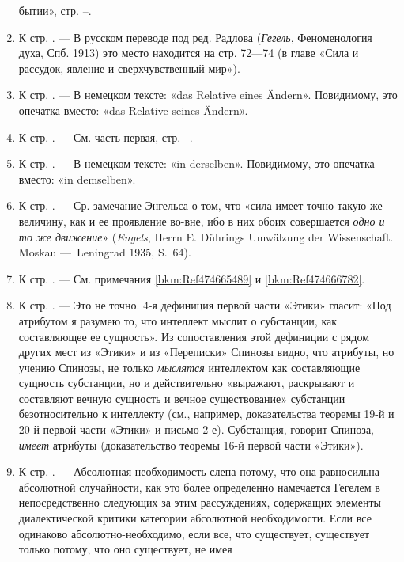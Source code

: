 \begin{enumerate}
бытии», стр. \pageref{bkm:bm85a}–\pageref{bkm:bm85b}.
\item \label{bkm:Ref474667017}К стр. \pageref{bkm:bm86}. — В русском
переводе под ред. Радлова ({\em Гегель}, Феноменология духа, Спб. 1913)
это место находится на стр. 72—74 (в главе «Сила и рассудок, явление и
сверхчувственный мир»).
\item \label{bkm:Ref474667030}К стр. \pageref{bkm:bm87}. — В немецком
тексте: «das Relative eines Ändern». Повидимому, это опечатка вместо: «das
Relative seines Ändern».
\item \label{bkm:Ref474667041}К стр. \pageref{bkm:bm88}. — См. часть первая,
стр. \pageref{bkm:bm88a}–\pageref{bkm:bm88b}.
\item \label{bkm:Ref474667057}К стр. \pageref{bkm:bm89}. — В немецком
тексте: «in derselben». Повидимому, это опечатка вместо: «in demselben».
\item \label{bkm:Ref474667072}К стр. \pageref{bkm:bm90}. — Ср. замечание
Энгельса о том, что «сила имеет точно такую же величину, как и ее
проявление во-вне, ибо в них обоих совершается {\em одно и то же
движение}» ({\em Engels}, Herrn E. Dührings Umwälzung der Wissenschaft.
Moskau —~Leningrad 1935, S.~64).
\item \label{bkm:Ref474669620}К стр. \pageref{bkm:bm91}. — См. примечания
\ref{bkm:Ref474665489} и \ref{bkm:Ref474666782}.
\item \label{bkm:Ref474669634}К стр. \pageref{bkm:bm92}. — Это не точно. 4-я
дефиниция первой части «Этики» гласит: «Под атрибутом я разумею то, что
интеллект мыслит о субстанции, как составляющее ее сущность». Из
сопоставления этой дефиниции с рядом других мест из «Этики» и из
«Переписки» Спинозы видно, что атрибуты, но учению Спинозы, не только
{\em мыслятся} интеллектом как составляющие сущность субстанции, но и
действительно «выражают, раскрывают и составляют вечную сущность и вечное
существование» субстанции безотносительно к интеллекту (см., например,
доказательства теоремы 19-й и 20-й первой части «Этики» и письмо 2-е).
Субстанция, говорит Спиноза, {\em имеет} атрибуты (доказательство
теоремы 16-й первой части «Этики»).
\item \label{bkm:Ref474669669}К стр. \pageref{bkm:bm93}. — Абсолютная
необходимость слепа потому, что она равносильна абсолютной случайности, как
это более определенно намечается Гегелем в непосредственно следующих за
этим рассуждениях, содержащих элементы диалектической критики категории
абсолютной необходимости. Если все одинаково абсолютно-необходимо, если
все, что существует, существует только потому, что оно существует, не имея

\end{enumerate}
